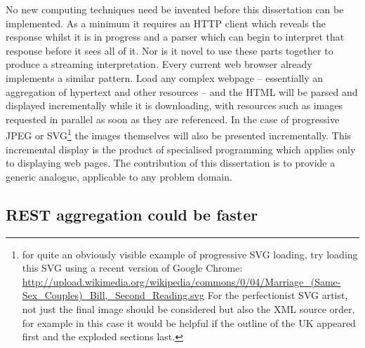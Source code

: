 \documentclass[12pt, ]{article}
\begin{document}
No new computing techniques need be invented before this dissertation
can be implemented. As a minimum it requires an HTTP client which
reveals the response whilst it is in progress and a parser which can
begin to interpret that response before it sees all of it. Nor is it
novel to use these parts together to produce a streaming interpretation.
Every current web browser already implements a similar pattern. Load any
complex webpage -- essentially an aggregation of hypertext and other
resources -- and the HTML will be parsed and displayed incrementally
while it is downloading, with resources such as images requested in
parallel as soon as they are referenced. In the case of progressive JPEG
or SVG\footnote{for quite an obviously visible example of progressive
  SVG loading, try loading this SVG using a recent version of Google
  Chrome:
  \url{http://upload.wikimedia.org/wikipedia/commons/0/04/Marriage_(Same-Sex_Couples)_Bill,_Second_Reading.svg}
  For the perfectionist SVG artist, not just the final image should be
  considered but also the XML source order, for example in this case it
  would be helpful if the outline of the UK appeared first and the
  exploded sections last.} the images themselves will also be presented
incrementally. This incremental display is the product of specialised
programming which applies only to displaying web pages. The contribution
of this dissertation is to provide a generic analogue, applicable to any
problem domain.

\subsection{REST aggregation could be
faster}\label{rest-aggregation-could-be-faster}
\end{document}
